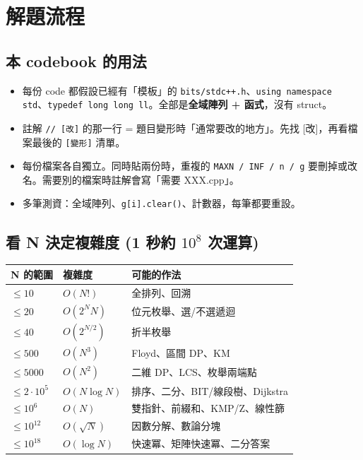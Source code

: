 \documentclass[portrait, 8pt, a4paper, oneside, twocolumn]{extarticle}
\begin{document}
\maketitlepage

\section{解題流程}

\subsection{本 codebook 的用法}
\begin{itemize}
    \item 每份 code 都假設已經有「模板」的 \texttt{bits/stdc++.h}、\texttt{using namespace std}、\texttt{typedef long long ll}。全部是\textbf{全域陣列 + 函式}，沒有 struct。
    \item 註解 \texttt{// [改]} 的那一行 = 題目變形時「通常要改的地方」。先找 [改]，再看檔案最後的 \texttt{[變形]} 清單。
    \item 每份檔案各自獨立。同時貼兩份時，重複的 \texttt{MAXN / INF / n / g} 要刪掉或改名。需要別的檔案時註解會寫「需要 XXX.cpp」。
    \item 多筆測資：全域陣列、\texttt{g[i].clear()}、計數器，每筆都要重設。
\end{itemize}

\subsection{看 N 決定複雜度 (1 秒約 $10^8$ 次運算)}
\begin{tabular}{@{}L{1.2cm}L{1.7cm}L{5.3cm}@{}}
\hline
N 的範圍 & 複雜度 & 可能的作法 \\ \hline
$\le 10$ & $O(N!)$ & 全排列、回溯 \\
$\le 20$ & $O(2^N N)$ & 位元枚舉、選/不選遞迴 \\
$\le 40$ & $O(2^{N/2})$ & 折半枚舉 \\
$\le 500$ & $O(N^3)$ & Floyd、區間 DP、KM \\
$\le 5000$ & $O(N^2)$ & 二維 DP、LCS、枚舉兩端點 \\
$\le 2\cdot10^5$ & $O(N\log N)$ & 排序、二分、BIT/線段樹、Dijkstra \\
$\le 10^6$ & $O(N)$ & 雙指針、前綴和、KMP/Z、線性篩 \\
$\le 10^{12}$ & $O(\sqrt N)$ & 因數分解、數論分塊 \\
$\le 10^{18}$ & $O(\log N)$ & 快速冪、矩陣快速冪、二分答案 \\ \hline
\end{tabular}
\end{document}
